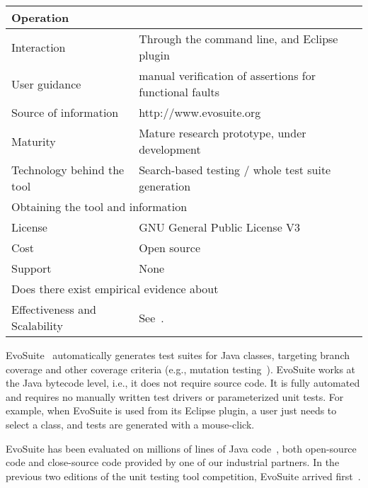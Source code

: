 \documentclass[10pt,conference,compsocconf]{IEEEtran}
\newcommand{\EVOSUITE}{{\sc EvoSuite}\xspace}
\begin{document}
\begin{table}[!h]
\begin{tabular}{|l|p{5cm}|}
  \hline
  \multicolumn{2}{|l|}{Operation} \\
  \hline
  Interaction &  Through the command line, and Eclipse plugin\\
  User guidance &  manual verification of assertions for functional faults\\
  Source of information &  http://www.evosuite.org \\
  Maturity&  Mature research prototype, under development\\
  Technology behind the tool & Search-based testing / whole test suite generation\\
\hline
  \multicolumn{2}{|l|}{Obtaining the tool and information} \\
  \hline
License & GNU General Public License V3\\
Cost & Open source\\
Support & None \\
\hline
\hline
  \multicolumn{2}{|l|}{Does there exist empirical evidence about} \\
  \hline
  Effectiveness and Scalability & See~\cite{GoA_TSE12,fraser2014large}. \\
\hline
\end{tabular}\vspace{-1em}
\end{table}


\EVOSUITE~\cite{FrA11c,GoA_TSE12} automatically generates test suites
for Java classes, targeting branch coverage and other coverage
criteria (e.g., mutation testing~\cite{emse14_mutation}). \EVOSUITE
works at the Java bytecode level, i.e., it does not require source
code. It is fully automated and requires no manually written test
drivers or parameterized unit tests.  For example, when \EVOSUITE is
used from its Eclipse plugin, a user
just needs to select a class, and tests are generated with a mouse-click.

\EVOSUITE has been evaluated on millions of lines of Java code~\cite{fraser2014large}, both open-source
code and close-source code provided by one of our industrial partners. 
In the previous two editions
of the unit testing tool
competition, \EVOSUITE arrived first~\cite{evosuiteAtSbst2013,evosuiteAtFittest2013}. 
\end{document}
